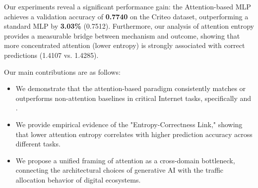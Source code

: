 Our experiments reveal a significant performance gain: the Attention-based MLP achieves a validation accuracy of {\bf 0.7740} on the Criteo dataset, outperforming a standard MLP by {\bf 3.03\%} (0.7512). Furthermore, our analysis of attention entropy provides a measurable bridge between mechanism and outcome, showing that more concentrated attention (lower entropy) is strongly associated with correct predictions (1.4107 vs. 1.4285).

Our main contributions are as follows:
\begin{itemize}[leftmargin=*,itemsep=0pt,topsep=0pt]
    \item We demonstrate that the attention-based paradigm consistently matches or outperforms non-attention baselines in critical Internet tasks, specifically \sectask and \ctrtask.
    \item We provide empirical evidence of the "Entropy-Correctness Link," showing that lower attention entropy correlates with higher prediction accuracy across different tasks.
    \item We propose a unified framing of attention as a cross-domain bottleneck, connecting the architectural choices of generative AI with the traffic allocation behavior of digital ecosystems.
\end{itemize}
